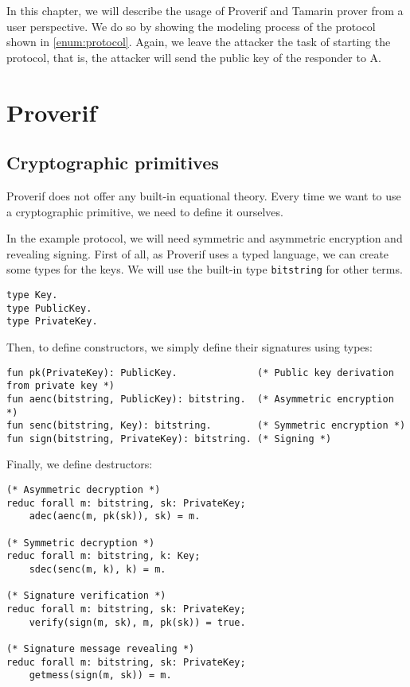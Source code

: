 
In this chapter, we will describe the usage of Proverif and Tamarin prover from a user perspective. We do so by showing the modeling process of the protocol shown in \cref{enum:protocol}. Again, we leave the attacker the task of starting the protocol, that is, the attacker will send the public key of the responder to A.


\lstset{language=proverif}
\section{Proverif}

\subsection{Cryptographic primitives}
Proverif does not offer any built-in equational theory. Every time we want to use a cryptographic primitive, we need to define it ourselves.

In the example protocol, we will need symmetric and asymmetric encryption and revealing signing. First of all, as Proverif uses a typed language, we can create some types for the keys. We will use the built-in type \lstinline{bitstring} for other terms.

\begin{lstlisting}
type Key.
type PublicKey.
type PrivateKey.
\end{lstlisting}

Then, to define constructors, we simply define their signatures using types:

\begin{lstlisting}
fun pk(PrivateKey): PublicKey.              (* Public key derivation from private key *)
fun aenc(bitstring, PublicKey): bitstring.  (* Asymmetric encryption *)
fun senc(bitstring, Key): bitstring.        (* Symmetric encryption *)
fun sign(bitstring, PrivateKey): bitstring. (* Signing *)
\end{lstlisting}

Finally, we define destructors:
\begin{lstlisting}
(* Asymmetric decryption *)
reduc forall m: bitstring, sk: PrivateKey;
    adec(aenc(m, pk(sk)), sk) = m.
  
(* Symmetric decryption *)
reduc forall m: bitstring, k: Key;
    sdec(senc(m, k), k) = m.

(* Signature verification *)
reduc forall m: bitstring, sk: PrivateKey;
    verify(sign(m, sk), m, pk(sk)) = true.

(* Signature message revealing *)
reduc forall m: bitstring, sk: PrivateKey;
    getmess(sign(m, sk)) = m.
\end{lstlisting}

